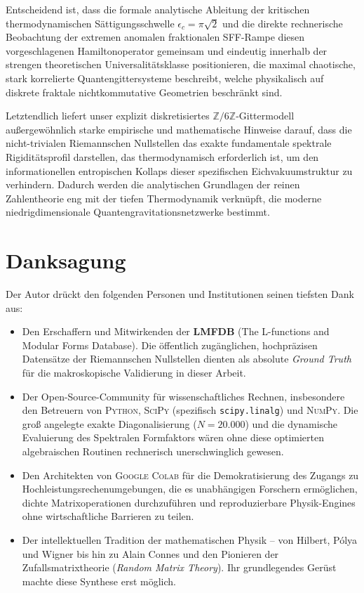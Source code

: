 \documentclass[aps,prl,preprint,superscriptaddress,floatfix]{revtex4-2}
\newcommand{\Zmod}{\mathbb{Z}/6\mathbb{Z}}
\begin{document}
Entscheidend ist, dass die formale analytische Ableitung der kritischen thermodynamischen Sättigungsschwelle $\epsilon_c = \pi\sqrt{2}$ und die direkte rechnerische Beobachtung der extremen anomalen fraktionalen SFF-Rampe diesen vorgeschlagenen Hamiltonoperator gemeinsam und eindeutig innerhalb der strengen theoretischen Universalitätsklasse positionieren, die maximal chaotische, stark korrelierte Quantengittersysteme beschreibt, welche physikalisch auf diskrete fraktale nichtkommutative Geometrien beschränkt sind.

Letztendlich liefert unser explizit diskretisiertes $\Zmod$-Gittermodell außergewöhnlich starke empirische und mathematische Hinweise darauf, dass die nicht-trivialen Riemannschen Nullstellen das exakte fundamentale spektrale Rigiditätsprofil darstellen, das thermodynamisch erforderlich ist, um den informationellen entropischen Kollaps dieser spezifischen Eichvakuumstruktur zu verhindern. Dadurch werden die analytischen Grundlagen der reinen Zahlentheorie eng mit der tiefen Thermodynamik verknüpft, die moderne niedrigdimensionale Quantengravitationsnetzwerke bestimmt.

\section*{Danksagung}
Der Autor drückt den folgenden Personen und Institutionen seinen tiefsten Dank aus:

\begin{itemize}
    \item Den Erschaffern und Mitwirkenden der \textbf{LMFDB} (The L-functions and Modular Forms Database). Die öffentlich zugänglichen, hochpräzisen Datensätze der Riemannschen Nullstellen dienten als absolute \textit{Ground Truth} für die makroskopische Validierung in dieser Arbeit.
    \item Der Open-Source-Community für wissenschaftliches Rechnen, insbesondere den Betreuern von \textsc{Python}, \textsc{SciPy} (spezifisch \texttt{scipy.linalg}) und \textsc{NumPy}. Die groß angelegte exakte Diagonalisierung ($N=20.000$) und die dynamische Evaluierung des Spektralen Formfaktors wären ohne diese optimierten algebraischen Routinen rechnerisch unerschwinglich gewesen.
    \item Den Architekten von \textsc{Google Colab} für die Demokratisierung des Zugangs zu Hochleistungsrechenumgebungen, die es unabhängigen Forschern ermöglichen, dichte Matrixoperationen durchzuführen und reproduzierbare Physik-Engines ohne wirtschaftliche Barrieren zu teilen.
    \item Der intellektuellen Tradition der mathematischen Physik – von Hilbert, Pólya und Wigner bis hin zu Alain Connes und den Pionieren der Zufallsmatrixtheorie (\textit{Random Matrix Theory}). Ihr grundlegendes Gerüst machte diese Synthese erst möglich.
\end{itemize}
\end{document}
